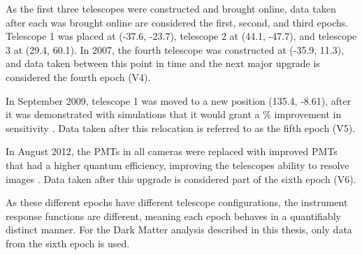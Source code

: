 As the first three telescopes were constructed and brought online, data taken after each was brought online are considered the first, second, and third epochs.
Telescope 1 was placed at (-37.6, -23.7), telescope 2 at (44.1, -47.7), and telescope 3 at (29.4, 60.1).
In 2007, the fourth telescope was constructed at (-35.9, 11.3), and data taken between this point in time and the next major upgrade is considered the fourth epoch (V4).

In September 2009, telescope 1 was moved to a new position (135.4, -8.61), after it was demonstrated with simulations that it would grant a \% improvement in sensitivity \cite{veritas_t1_move}.
Data taken after this relocation is referred to as the fifth epoch (V5).

In August 2012, the PMTs in all cameras were replaced with improved PMTs that had a higher quantum efficiency, improving the telescopes ability to resolve images \cite{pmtmodels}.
Data taken after this upgrade is considered part of the sixth epoch (V6).

As these different epochs have different telescope configurations, the instrument response functions are different, meaning each epoch behaves in a quantifiably distinct manner.
For the Dark Matter analysis described in this thesis, only data from the sixth epoch is used.


